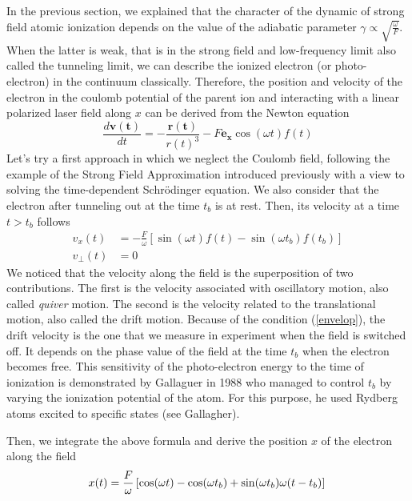 \documentclass[a4paper]{article}
\begin{document}
In the previous section, we explained that the character of the dynamic of strong field atomic ionization depends on the value of the adiabatic parameter $\gamma \propto \sqrt{\frac{\omega}{F}}$. When the latter is weak, that is in the strong field and low-frequency limit also called the tunneling limit, we can describe the ionized electron (or photo-electron) in the continuum classically. Therefore, the position and velocity of the electron in the coulomb potential of the parent ion and interacting with a linear polarized laser field along $x$ can be derived from the Newton equation
\begin{equation}
\frac{d \mathbf{v(t)}}{dt}=-\frac{\mathbf{r(t)}}{r(t)^{3}}-F\mathbf{e_{x}}\cos(\omega t) f(t) 
\end{equation}
Let's try a first approach in which we neglect the Coulomb field, following the example of the Strong Field Approximation introduced previously with a view to solving the time-dependent Schr\"odinger equation. We also consider that the electron after tunneling out at the time $t_{b}$ is at rest. Then, its velocity at a time $t>t_{b}$ follows
\begin{align}
\label{velocity_free_motion}
v_{x}(t)&=-\frac{F}{\omega}\left[\sin(\omega t) f(t)-\sin(\omega t_{b}) f(t_{b})\right] \\
v_{\perp}(t)&=0
\end{align}
We noticed that the velocity along the field is the superposition of two contributions. The first is the velocity associated with oscillatory motion, also called \textit{quiver} motion. The second is the velocity related to the translational motion, also called the drift motion. Because of the condition (\ref{envelop}), the drift velocity is the one that we measure in experiment when the field is switched off. It depends on the phase value of the field at the time $t_{b}$ when the electron becomes free. This sensitivity of the photo-electron energy to the time of ionization is demonstrated by Gallaguer in 1988 who managed to control $t_{b}$ by varying the ionization potential of the atom. For this purpose, he used Rydberg atoms excited to specific states (see Gallagher).
\par
Then, we integrate the above formula and derive the position $x$ of the electron along the field
\begin{equation}
\label{position_free_motion}
x(t)=\frac{F}{\omega}\left[\cos(\omega t)-\cos(\omega t_{b})+\sin(\omega t_{b})\omega(t-t_{b})\right] \\
\end{equation}
\end{document}
